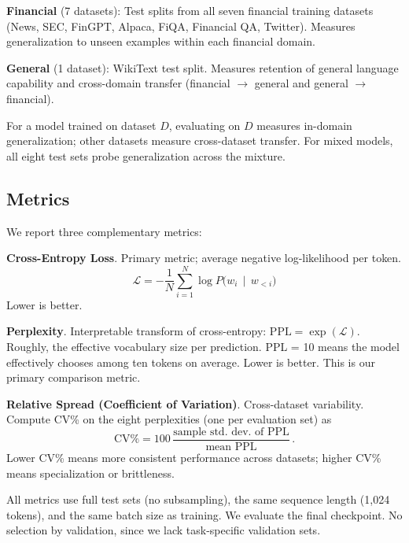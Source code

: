 \textbf{Financial} (7 datasets): Test splits from all seven financial training datasets (News, SEC, FinGPT, Alpaca, FiQA, Financial QA, Twitter). Measures generalization to unseen examples within each financial domain.

\textbf{General} (1 dataset): WikiText test split. Measures retention of general language capability and cross-domain transfer (financial $\to$ general and general $\to$ financial).

For a model trained on dataset $D$, evaluating on $D$ measures in-domain generalization; other datasets measure cross-dataset transfer. For mixed models, all eight test sets probe generalization across the mixture.

\subsection{Metrics}

We report three complementary metrics:

\textbf{Cross-Entropy Loss}. Primary metric; average negative log-likelihood per token.
\begin{equation*}
    \mathcal{L} = -\frac{1}{N}\sum_{i=1}^{N} \log P\bigl(w_i \,\mid\, w_{<i}\bigr)
\end{equation*}
Lower is better.

\textbf{Perplexity}. Interpretable transform of cross-entropy: $\text{PPL} = \exp(\mathcal{L})$. Roughly, the effective vocabulary size per prediction. PPL = 10 means the model effectively chooses among ten tokens on average. Lower is better. This is our primary comparison metric.

\textbf{Relative Spread (Coefficient of Variation)}. Cross-dataset variability. Compute CV\% on the eight perplexities (one per evaluation set) as
\begin{equation*}
    \text{CV}\% = 100\,\frac{\text{sample std. dev. of PPL}}{\text{mean PPL}}\, .
\end{equation*}
Lower CV\% means more consistent performance across datasets; higher CV\% means specialization or brittleness.

All metrics use full test sets (no subsampling), the same sequence length (1,024 tokens), and the same batch size as training. We evaluate the final checkpoint. No selection by validation, since we lack task-specific validation sets.
